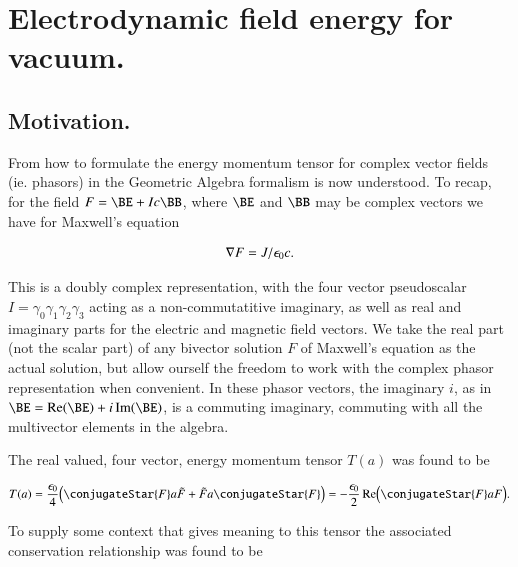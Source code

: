 %

\chapter{Electrodynamic field energy for vacuum.}
\label{chap:fourierMaxVac}
{}
\date{Dec 16, 2009}

\beginArtNoToc

\section{Motivation.}

From  how to formulate the energy momentum tensor for complex vector fields (ie. phasors) in the Geometric Algebra formalism is now understood.  To recap, for the field $F = \BE + I c \BB$, where $\BE$ and $\BB$ may be complex vectors we have for Maxwell's equation

\begin{align}\label{eqn:fourierMaxVac:1}
\nabla F = J/\epsilon_0 c.
\end{align}

This is a doubly complex representation, with the four vector pseudoscalar $I = \gamma_0 \gamma_1 \gamma_2 \gamma_3$ acting as a non-commutatitive imaginary, as well as real and imaginary parts for the electric and magnetic field vectors.  We take the real part (not the scalar part) of any bivector solution $F$ of Maxwell's equation as the actual solution, but allow ourself the freedom to work with the complex phasor representation when convenient.  In these phasor vectors, the imaginary $i$, as in $\BE = \Real(\BE) + i \Imag(\BE)$, is a commuting imaginary, commuting with all the multivector elements in the algebra.

The real valued, four vector, energy momentum tensor $T(a)$ was found to be

\begin{align}\label{eqn:fourierMaxVac:2}
T(a) = \frac{\epsilon_0}{4} \Bigl( \conjugateStar{F} a \tilde{F} + \tilde{F} a \conjugateStar{F} \Bigr) = 
-\frac{\epsilon_0}{2} \Real \Bigl( \conjugateStar{F} a F \Bigr).
\end{align}

To supply some context that gives meaning to this tensor the associated conservation relationship was found to be

